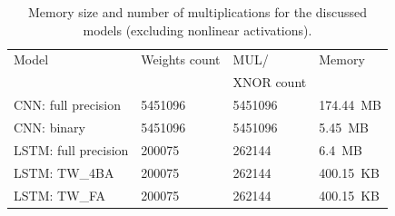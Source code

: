 \begin{table}[!t]
\begin{center}
\begin{tabular}{|l|l|l|l|}
	\hline
    Model     & Weights count & MUL/ & Memory\\
    & & XNOR count & \\
    \hline
    CNN: full precision & 5451096 & 5451096 & 174.44~MB\\
    \hline
    CNN: binary & 5451096 & 5451096 & 5.45~MB\\
    \hline
    LSTM: full precision & 200075 & 262144 & 6.4~MB\\
    \hline
    LSTM: TW\_4BA & 200075 & 262144 & 400.15~KB\\
    \hline
    LSTM: TW\_FA & 200075 & 262144 &400.15~KB\\
    \hline
\end{tabular}
\end{center}
\caption{Memory size and number of multiplications for the discussed models (excluding nonlinear activations).}
\label{table_quant_perf}
\end{table}


\begin{table}[!t]
\begin{center}
\end{center}
\caption{Inference engine performance in number of classification per second on different platforms.}
\label{table_perf_comp}
\end{table}


